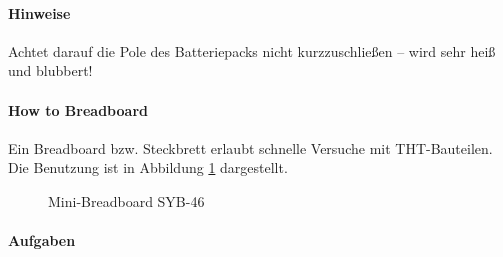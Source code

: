 \paragraph{Hinweise}

Achtet darauf die Pole des Batteriepacks nicht kurzzuschließen -- wird sehr heiß
und blubbert!

\paragraph{How to Breadboard}

Ein Breadboard bzw. Steckbrett erlaubt schnelle Versuche mit THT-Bauteilen. Die
Benutzung ist in Abbildung \ref{fig:breadboard} dargestellt.

\begin{figure}[htbp]
  \centering
  \caption{Mini-Breadboard SYB-46 \cite{afutub}} %
  \label{fig:breadboard}
\end{figure}


\clearpage

\paragraph{Aufgaben}

